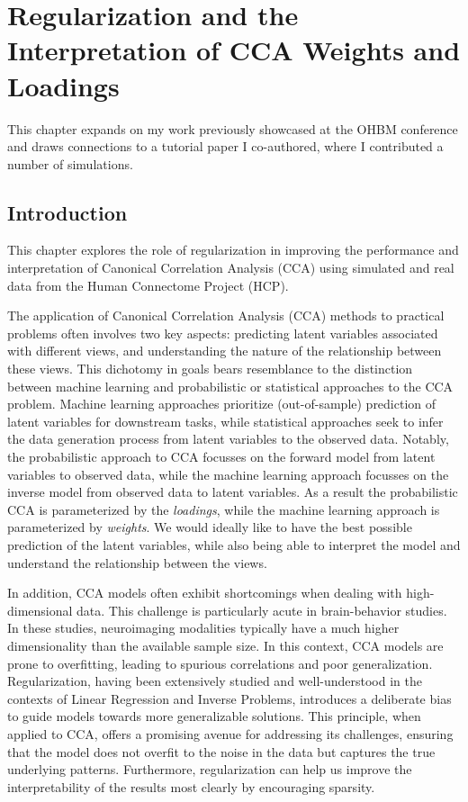 \chapter{Regularization and the Interpretation of CCA Weights and Loadings}\label{chap:als}
\minitoc

This chapter expands on my work previously showcased at the OHBM conference and draws connections to a tutorial paper I co-authored, where I contributed a number of simulations\citep{mihalik2022canonical}.

\section{Introduction}\label{sec:introduction}

This chapter explores the role of regularization in improving the performance and interpretation of Canonical
Correlation Analysis (CCA) using simulated and real data from the Human Connectome Project (HCP).

The application of Canonical Correlation Analysis (CCA) methods to practical problems often involves two key aspects: predicting latent variables associated with different views, and understanding the nature of the relationship between these views.
This dichotomy in goals bears resemblance to the distinction between machine learning and probabilistic or statistical approaches to the CCA problem.
Machine learning approaches prioritize (out-of-sample) prediction of latent variables for downstream tasks, while statistical approaches seek to infer the data generation process from latent variables to the observed data.
Notably, the probabilistic approach to CCA focusses on the forward model from latent variables to observed data, while the machine learning approach focusses on the inverse model from observed data to latent variables.
As a result the probabilistic CCA is parameterized by the \textit{loadings}, while the machine learning approach is parameterized by \textit{weights}.
We would ideally like to have the best possible prediction of the latent variables, while also being able to interpret the model and understand the relationship between the views.

In addition, CCA models often exhibit shortcomings when dealing with high-dimensional data.
This challenge is particularly acute in brain-behavior studies.
In these studies, neuroimaging modalities typically have a much higher dimensionality than the available sample size.
In this context, CCA models are prone to overfitting, leading to spurious correlations and poor generalization.
Regularization, having been extensively studied and well-understood in the contexts of Linear Regression and Inverse Problems, introduces a deliberate bias to guide models towards more generalizable solutions.
This principle, when applied to CCA, offers a promising avenue for addressing its challenges, ensuring that the model does not overfit to the noise in the data but captures the true underlying patterns.
Furthermore, regularization can help us improve the interpretability of the results most clearly by encouraging sparsity.

